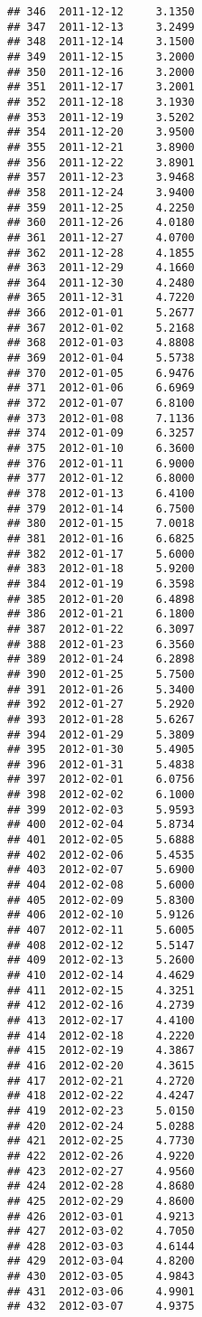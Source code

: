 \documentclass[
]{article}
\begin{document}
\begin{verbatim}
## 346  2011-12-12     3.1350
## 347  2011-12-13     3.2499
## 348  2011-12-14     3.1500
## 349  2011-12-15     3.2000
## 350  2011-12-16     3.2000
## 351  2011-12-17     3.2001
## 352  2011-12-18     3.1930
## 353  2011-12-19     3.5202
## 354  2011-12-20     3.9500
## 355  2011-12-21     3.8900
## 356  2011-12-22     3.8901
## 357  2011-12-23     3.9468
## 358  2011-12-24     3.9400
## 359  2011-12-25     4.2250
## 360  2011-12-26     4.0180
## 361  2011-12-27     4.0700
## 362  2011-12-28     4.1855
## 363  2011-12-29     4.1660
## 364  2011-12-30     4.2480
## 365  2011-12-31     4.7220
## 366  2012-01-01     5.2677
## 367  2012-01-02     5.2168
## 368  2012-01-03     4.8808
## 369  2012-01-04     5.5738
## 370  2012-01-05     6.9476
## 371  2012-01-06     6.6969
## 372  2012-01-07     6.8100
## 373  2012-01-08     7.1136
## 374  2012-01-09     6.3257
## 375  2012-01-10     6.3600
## 376  2012-01-11     6.9000
## 377  2012-01-12     6.8000
## 378  2012-01-13     6.4100
## 379  2012-01-14     6.7500
## 380  2012-01-15     7.0018
## 381  2012-01-16     6.6825
## 382  2012-01-17     5.6000
## 383  2012-01-18     5.9200
## 384  2012-01-19     6.3598
## 385  2012-01-20     6.4898
## 386  2012-01-21     6.1800
## 387  2012-01-22     6.3097
## 388  2012-01-23     6.3560
## 389  2012-01-24     6.2898
## 390  2012-01-25     5.7500
## 391  2012-01-26     5.3400
## 392  2012-01-27     5.2920
## 393  2012-01-28     5.6267
## 394  2012-01-29     5.3809
## 395  2012-01-30     5.4905
## 396  2012-01-31     5.4838
## 397  2012-02-01     6.0756
## 398  2012-02-02     6.1000
## 399  2012-02-03     5.9593
## 400  2012-02-04     5.8734
## 401  2012-02-05     5.6888
## 402  2012-02-06     5.4535
## 403  2012-02-07     5.6900
## 404  2012-02-08     5.6000
## 405  2012-02-09     5.8300
## 406  2012-02-10     5.9126
## 407  2012-02-11     5.6005
## 408  2012-02-12     5.5147
## 409  2012-02-13     5.2600
## 410  2012-02-14     4.4629
## 411  2012-02-15     4.3251
## 412  2012-02-16     4.2739
## 413  2012-02-17     4.4100
## 414  2012-02-18     4.2220
## 415  2012-02-19     4.3867
## 416  2012-02-20     4.3615
## 417  2012-02-21     4.2720
## 418  2012-02-22     4.4247
## 419  2012-02-23     5.0150
## 420  2012-02-24     5.0288
## 421  2012-02-25     4.7730
## 422  2012-02-26     4.9220
## 423  2012-02-27     4.9560
## 424  2012-02-28     4.8680
## 425  2012-02-29     4.8600
## 426  2012-03-01     4.9213
## 427  2012-03-02     4.7050
## 428  2012-03-03     4.6144
## 429  2012-03-04     4.8200
## 430  2012-03-05     4.9843
## 431  2012-03-06     4.9901
## 432  2012-03-07     4.9375

\end{verbatim}
\end{document}
